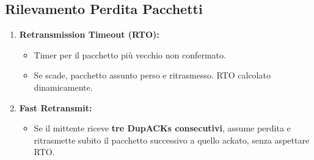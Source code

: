 \documentclass{article}
\begin{document}
\subsection{Rilevamento Perdita Pacchetti}
\begin{enumerate}
    \item \textbf{Retransmission Timeout (RTO):}
    \begin{itemize}
        \item Timer per il pacchetto più vecchio non confermato.
        \item Se scade, pacchetto assunto perso e ritrasmesso. RTO calcolato dinamicamente.
    \end{itemize}
    \item \textbf{Fast Retransmit:}
    \begin{itemize}
        \item Se il mittente riceve \textbf{tre DupACKs consecutivi}, assume perdita e ritrasmette subito il pacchetto successivo a quello ackato, senza aspettare RTO.
    \end{itemize}
\end{enumerate}
\end{document}
